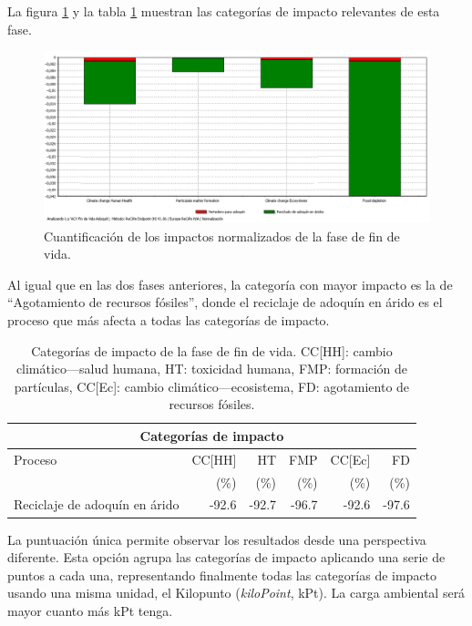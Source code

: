 La figura \ref{fig:fdv_normalizacion} y la tabla \ref{categoriasimpactofdv} muestran las categorías de impacto relevantes de esta fase.

\begin{figure}[!htb]
\centering
\includegraphics[width=15cm]{img/fdv_normalizacion.png}
\caption{Cuantificación de los impactos normalizados de la fase de fin de vida.}
\label{fig:fdv_normalizacion}
\end{figure}

Al igual que en las dos fases anteriores, la categoría con mayor impacto es la de ``Agotamiento de recursos fósiles'', donde el reciclaje de adoquín en árido es el proceso que más afecta a todas las categorías de impacto.

\begin{table}[!htb]
\centering
\begin{tabular}{p{4cm}rrrrr}
\toprule
\multicolumn{6}{c}{Categorías de impacto}\\
\midrule
Proceso & CC[HH] & HT & FMP & CC[Ec] & FD\\
 & (\%) & (\%) & (\%) & (\%) & (\%)\\
\midrule
Reciclaje de adoquín en árido & -92.6 & -92.7 & -96.7 & -92.6 & -97.6\\
\bottomrule
\end{tabular}
\caption[Categorías de impacto de la fase de fin de vida.]{Categorías de impacto de la fase de fin de vida. CC[HH]: cambio climático—salud humana, HT: toxicidad humana, FMP: formación de partículas, CC[Ec]: cambio climático—ecosistema, FD: agotamiento de recursos fósiles.}
\label{categoriasimpactofdv}
\end{table}

La puntuación única permite observar los resultados desde una perspectiva diferente. Esta opción agrupa las categorías de impacto aplicando una serie de puntos a cada una, representando finalmente todas las categorías de impacto usando una misma unidad, el Kilopunto (\textit{kiloPoint}, kPt). La carga ambiental será mayor cuanto más kPt tenga.

